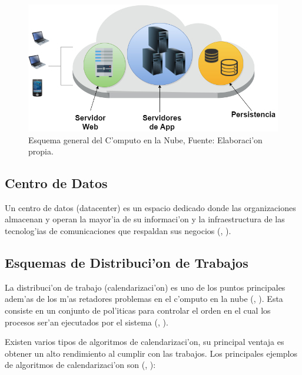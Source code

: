 \begin{figure}
	\caption{Esquema general del C'omputo en la Nube, Fuente: Elaboraci'on propia.}
	\centering
	\includegraphics[scale=0.5]{media/cloud1}
\end{figure}
\subsection*{Centro de Datos}
Un centro de datos (datacenter) es un espacio dedicado donde las organizaciones almacenan y operan la mayor'ia de su informaci'on y la infraestructura de las tecnolog'ias de comunicaciones que respaldan sus negocios (\citeauthor{whatisdatacenter}, \citeyear{whatisdatacenter}).

\subsection*{Esquemas de Distribuci'on de Trabajos}

La distribuci'on de trabajo (calendarizaci'on) es uno de los puntos principales adem'as de los m'as retadores problemas en el c'omputo en la nube (\citeauthor{li2014greedy}, \citeyear{li2014greedy}). Esta consiste en un conjunto de pol'iticas para controlar el orden en el cual los procesos ser'an ejecutados por el sistema (\citeauthor{agarwal2014efficient}, \citeyear{agarwal2014efficient}).

Existen varios tipos de algoritmos de calendarizaci'on, su principal ventaja es obtener un alto rendimiento al cumplir con las trabajos. Los principales ejemplos de algoritmos de calendarizaci'on son (\citeauthor{salot2013survey}, \citeyear{salot2013survey}):

